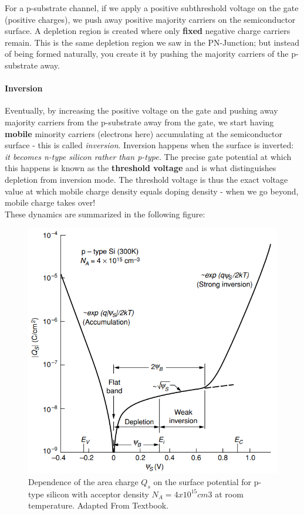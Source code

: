 For a p-substrate channel, if we apply a positive subthreshold voltage on the gate (positive charges), we push away positive majority carriers on the semiconductor surface. A depletion region is created where only \textbf{fixed} negative charge carriers remain. This is the same depletion region we saw in the PN-Junction; but instead of being formed naturally, you create it by pushing the majority carriers of the p-substrate away. 

\paragraph{Inversion}

Eventually, by increasing the positive voltage on the gate and pushing away majority carriers from the p-substrate away from the gate, we start having \textbf{mobile} minority carriers (electrons here) accumulating at the semiconductor surface - this is called \textit{inversion}. Inversion happens when the surface is inverted: \textit{it becomes n-type silicon rather than p-type.} The precise gate potential at which this happens is known as the \textbf{threshold voltage} and is what distinguishes depletion from inversion mode. The threshold voltage is thus the exact voltage value at which mobile charge density equals doping density - when we go beyond, mobile charge takes over! \\

These dynamics are summarized in the following figure: 

\begin{figure}[H]
    \centering
    \includegraphics[width=0.6\linewidth]{../../Figures/Surface_Potential_MOS.PNG}
    \caption{Dependence of the area charge $Q_s$ on the surface potential for p-type silicon with acceptor density $N_A = 4 x10^{15} cm3$ at room temperature. Adapted From Textbook.}
    \label{fig:Surface_Potential_MOS}
\end{figure}

